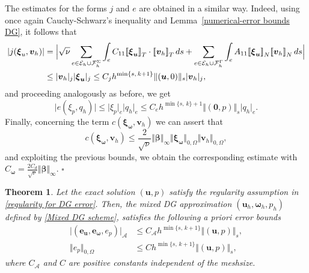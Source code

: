 \documentclass[reqno,a4paper]{article}
\numberwithin{equation}{section}
\newcommand\bu{\boldsymbol{u}}
\newcommand\bv{\boldsymbol{v}}
\newcommand\bbbeta{\boldsymbol{\beta}}
\newcommand\cE{{\mathcal{E}}}
\newcommand\cF{{\mathcal{F}}}
\renewcommand\O{\Omega}
\newcommand\bomega{\boldsymbol{\omega}}
\newcommand\be{\boldsymbol{e}}
\newcommand\bxi{\boldsymbol{\xi}}
\newtheorem{theorem}{Theorem}[section]
\newcommand{\jumpT}[1]{{\left[\![#1\right]\!]}_T}
\newcommand{\jumpN}[1]{{\left[\![#1\right]\!]}_N}
\newenvironment{proof}{\noindent{\it Proof.}}{\hfill$\square$}
\begin{document}
\begin{proof}
The estimates for the forms $j$ and $e$ are obtained in a similar way.
Indeed, using once again Cauchy-Schwarz's inequality and Lemma~\ref{numerical-error bounds DG}, it follows that  
\begin{align*}
 \vert j(\bxi_{u},\bv_h)\vert& = \Big{\vert}\sqrt{\nu}\sum_{e\in\cE_{h}\cup\cF_h^{\Sigma}}\int_{e}C_{11} \jumpT{\bxi_{\bu}}\cdot\jumpT{\bv_h}\,ds+ \sum_{e\in\cE_{h}\cup\cF_h^{\Gamma}}\int_{e}A_{11} \jumpN{\bxi_{\bu}}\jumpN{\bv_h}\,ds \Big{\vert}  \\
 &\leq  \vert \bv_h\vert_j \vert \bxi_{\bu}\vert_j\leq C_{j} h^{\min\{s,\,k+1\}}\Vert(\bu,0)\Vert_{s} \vert \bv_h\vert_{j},
\end{align*}
and proceeding analogously as before, we get 
$$
 \vert e(\xi_{p},q_h)\vert \leq  \vert\xi_{p} \vert_{e}\vert q_h \vert_{e}\leq  C_{e} h^{\min\{s,\,k\}+1}\Vert(\mathbf{0},p)\Vert_{s}\vert q_h\vert_{e}.
$$
Finally, concerning the term $c(\bxi_{\bomega},\bv_h)$ we can assert that 
\begin{equation*}
 c(\bxi_{\bomega},\bv_h)\leq \frac{2}{\sqrt{\nu}} \Vert\bbbeta\Vert_{\infty}\Vert\bxi_{\bomega}\Vert_{0,\O}\Vert \bv_h\Vert_{0,\O},
\end{equation*}
and exploiting the previous bounds, we obtain the corresponding estimate with $C_{\bomega}=\frac{2C_{d}}{\sqrt{\nu}}\Vert\bbbeta\Vert_{\infty}$.
\end{proof}



\begin{theorem}\label{th: convergence DG}
Let the exact solution $(\bu,p)$ satisfy the regularity assumption
in \eqref{regularity for DG error}. Then, the mixed DG approximation
$(\bu_h,\bomega_h,p_h)$ defined by \eqref{Mixed DG scheme}, satisfies the following a priori error bounds
%
\begin{align}\label{energy error bound DG}
 \vert(\be_{\bu} ,\be_{\bomega},e_p)\vert_{\mathcal{A}} & \leq C_{\mathcal{A}} h^{\min\{s,\,k+1\}}\Vert(\bu,p)\Vert_{s},\\
\label{pressue error bound DG}
\Vert e_{p}\Vert_{0,\O} & \leq  C h^{\min\{s,\,k+1\}}\Vert(\bu,p)\Vert_{s},
\end{align}
where $C_{\mathcal{A}}$ and $C$ are positive constants independent of the meshsize. 
 \end{theorem}
\end{document}
